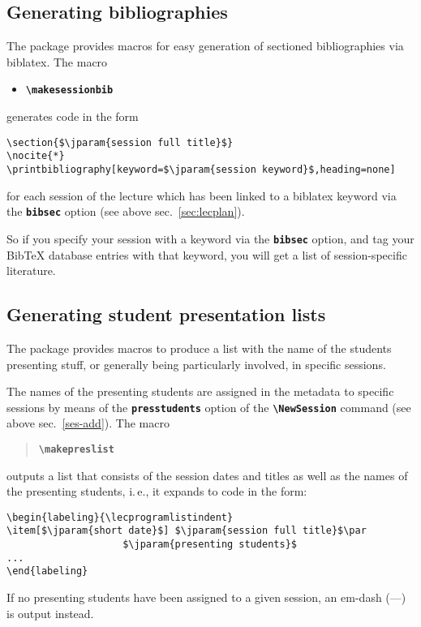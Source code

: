 \documentclass[english]{article}
\newcommand*\jmacro[1]{\textbf{\texttt{#1}}}
\newcommand*\jcsmacro[1]{\jmacro{\textbackslash{#1}}}
\newcommand*\joption[1]{\textbf{\texttt{#1}}}
\newcommand*\jparam[1]{\angus #1\angud}
\begin{document}
\subsection{Generating bibliographies\label{sub:bibliographies}}

The package provides macros for easy generation of sectioned bibliographies
via \textsf{biblatex}. The macro
\begin{itemize}
\item \jcsmacro{makesessionbib}
\end{itemize}
generates code in the form
\begin{lstlisting}[basicstyle={\small\ttfamily},frame=single,
                   escapechar=\$,moretexcs={[1]{printbibliography}}]
\section{$\jparam{session full title}$}
\nocite{*}
\printbibliography[keyword=$\jparam{session keyword}$,heading=none]
\end{lstlisting}
 for each session of the lecture which has been linked to a \textsf{biblatex}
keyword via the \joption{bibsec} option (see above sec.~\ref{sec:lecplan}).

So if you specify your session with a keyword via the \joption{bibsec}
option, and tag your Bib\TeX{} database entries with that keyword,
you will get a list of session-specific literature.


\subsection{Generating student presentation lists}\label{sec:preslists}

The package provides macros to produce a list with the name of the students presenting
stuff, or generally being particularly involved, in specific sessions.

The names of the presenting students are assigned in the metadata to specific sessions
by means of the \joption{presstudents} option of the \jcsmacro{NewSession} command
(see above sec.~\ref{ses-add}). The macro

\begin{quote}
\jcsmacro{makepreslist}
\end{quote}
outputs a list that consists of the session dates and titles as well as the names of the
presenting students, i.\,e., it expands to code in the form:
\begin{lstlisting}[language={[LaTeX]TeX},basicstyle={\small\ttfamily},
                   escapechar=\$,frame=single]
\begin{labeling}{\lecprogramlistindent}
\item[$\jparam{short date}$] $\jparam{session full title}$\par
                    $\jparam{presenting students}$
...
\end{labeling}
\end{lstlisting}
If no presenting students have been assigned to a given session,
an em-dash (---) is output instead.
\end{document}
